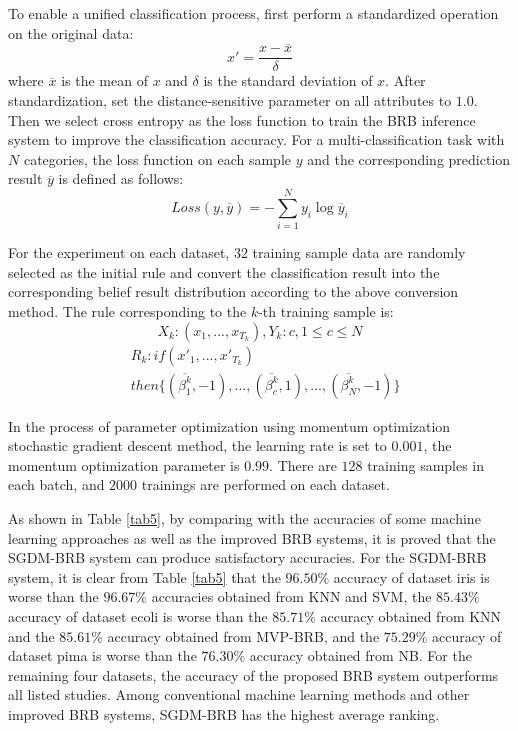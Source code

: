 \documentclass{ieeeaccess}
\begin{document}
To enable a unified classification process, first perform a standardized operation on the original data:
$$x'=\frac{x-\overline{x}}{\delta}$$
where $\overline{x}$ is the mean of $x$ and $\delta$ is the standard deviation of $x$.
After standardization, set the distance-sensitive parameter on all attributes to $1.0$.
Then we select cross entropy as the loss function to train the BRB inference system to improve the classification accuracy.
For a multi-classification task with $N$ categories, the loss function on each sample $y$ and the corresponding prediction result $\overline{y}$ is defined as follows:
$$Loss(y,\overline{y})=-\sum_{i=1}^Ny_{i}\log\overline{y}_i$$

For the experiment on each dataset, $32$ training sample data are randomly selected as the initial rule
and convert the classification result into the corresponding belief result distribution according to the above conversion method.
The rule corresponding to the $k$-th training sample is:
\begin{equation}
    X_k:(x_1,...,x_{T_k}),Y_k:c,1\leq c\leq N
\end{equation}
\begin{equation}
    \begin{split}
        &R_k:if(x'_1,...,x'_{T_k})\\
        &then\{(\overline{\beta_1^k},-1),...,(\overline{\beta_c^k},1),...,(\overline{\beta_N^k},-1)\}
    \end{split}
\end{equation}

In the process of parameter optimization using momentum optimization stochastic gradient descent method,
the learning rate is set to $0.001$, the momentum optimization parameter is $0.99$.
There are $128$ training samples in each batch, and $2000$ trainings are performed on each dataset.

As shown in Table \ref{tab5}, by comparing with the accuracies of some machine learning approaches as well as the improved BRB systems, it is proved that the SGDM-BRB system can produce satisfactory accuracies.
For the SGDM-BRB system, it is clear from Table \ref{tab5} that
the $96.50\%$ accuracy of dataset iris is worse than the $96.67\%$ accuracies obtained from KNN and SVM,
the $85.43\%$ accuracy of dataset ecoli is worse than the $85.71\%$ accuracy obtained from KNN and the $85.61\%$ accuracy obtained from MVP-BRB,
and the $75.29\%$ accuracy of dataset pima is worse than the $76.30\%$ accuracy obtained from NB.
For the remaining four datasets, the accuracy of the proposed BRB system outperforms all listed studies.
Among conventional machine learning methods and other improved BRB systems, SGDM-BRB has the highest average ranking.
\end{document}
